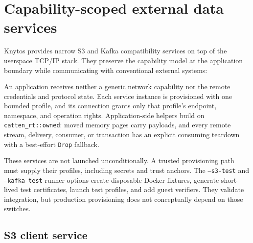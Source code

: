 \section{Capability-scoped external data services}
\label{sec:external-data-services}

Knytos provides narrow S3 and Kafka compatibility services on top of the
userspace TCP/IP stack. They preserve the capability model at the application
boundary while communicating with conventional external systems:

\begin{center}
\end{center}

An application receives neither a generic network capability nor the remote
credentials and protocol state. Each service instance is provisioned with one
bounded profile, and its connection grants only that profile's endpoint,
namespace, and operation rights. Application-side helpers build on
\texttt{catten\_rt::owned}: moved memory pages carry payloads, and every remote
stream, delivery, consumer, or transaction has an explicit consuming teardown
with a best-effort \texttt{Drop} fallback.

These services are not launched unconditionally. A trusted provisioning path
must supply their profiles, including secrets and trust anchors. The
\texttt{--s3-test} and \texttt{--kafka-test} runner options create disposable
Docker fixtures, generate short-lived test certificates, launch test profiles,
and add guest verifiers. They validate integration, but production provisioning
does not conceptually depend on those switches.

\subsection{S3 client service}
\label{sec:s3-service}


